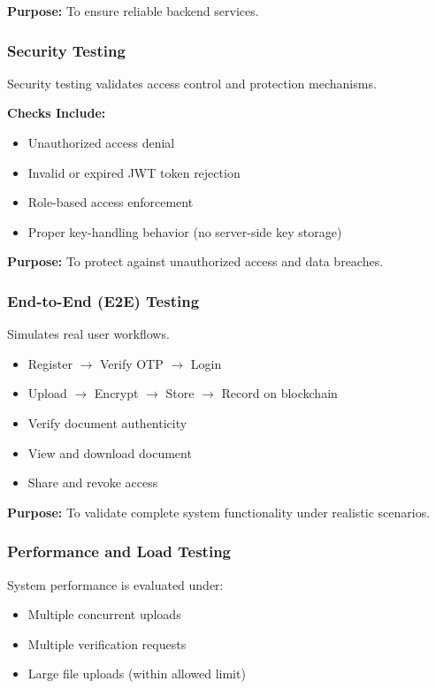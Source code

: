 \documentclass[12pt]{article}
\begin{document}
\textbf{Purpose:}  
To ensure reliable backend services.

\subsubsection{Security Testing}

Security testing validates access control and protection mechanisms.

\textbf{Checks Include:}
\begin{itemize}
\item Unauthorized access denial
\item Invalid or expired JWT token rejection
\item Role-based access enforcement
\item Proper key-handling behavior (no server-side key storage)
\end{itemize}

\textbf{Purpose:}  
To protect against unauthorized access and data breaches.

\subsubsection{End-to-End (E2E) Testing}

Simulates real user workflows.

\begin{itemize}
\item Register $\rightarrow$ Verify OTP $\rightarrow$ Login
\item Upload $\rightarrow$ Encrypt $\rightarrow$ Store $\rightarrow$ Record on blockchain
\item Verify document authenticity
\item View and download document
\item Share and revoke access
\end{itemize}

\textbf{Purpose:}  
To validate complete system functionality under realistic scenarios.

\subsubsection{Performance and Load Testing}

System performance is evaluated under:

\begin{itemize}
\item Multiple concurrent uploads
\item Multiple verification requests
\item Large file uploads (within allowed limit)
\end{itemize}
\end{document}
